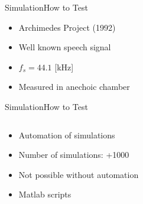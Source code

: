 \begin{frame}{Simulation}{How to Test}	
\begin{itemize}
	\item Archimedes Project (1992)
	\item Well known speech signal
	\item $f_s = 44.1$ [kHz] 
	\item Measured in anechoic chamber		
\end{itemize}
\end{frame}

\begin{frame}{Simulation}{How to Test}	

\begin{columns}
	\begin{column}{0.6\textwidth}
	\begin{itemize}
			\item Automation of simulations
			\item Number of simulations: +1000	
			\item Not possible without automation
			\item Matlab scripts	
	\end{itemize}
	\end{column}
	\begin{column}{0.4\textwidth}
	\end{column}
\end{columns}
\end{frame}




